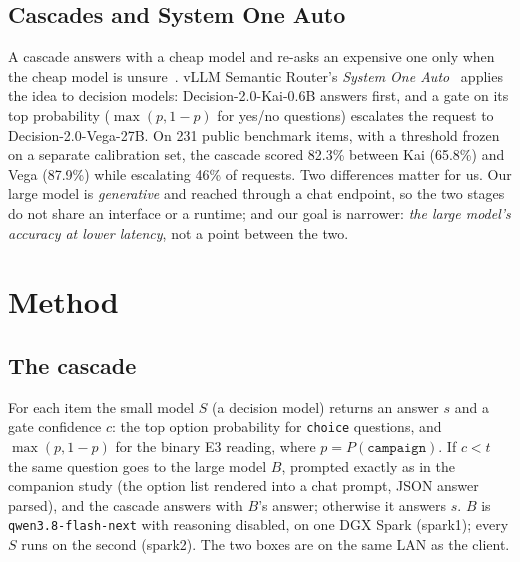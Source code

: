 \documentclass[11pt]{article}
\begin{document}
\subsection{Cascades and System One Auto}
A cascade answers with a cheap model and re-asks an expensive one only when the cheap model is
unsure~\cite{frugalgpt,routellm}. vLLM Semantic Router's \emph{System One Auto}~\cite{sysoneauto}
applies the idea to decision models: Decision-2.0-Kai-0.6B answers first, and a gate on its top
probability ($\max(p,1-p)$ for yes/no questions) escalates the request to Decision-2.0-Vega-27B.
On 231 public benchmark items, with a threshold frozen on a separate calibration set, the cascade
scored 82.3\% between Kai (65.8\%) and Vega (87.9\%) while escalating 46\% of requests. Two
differences matter for us. Our large model is \emph{generative} and reached through a chat endpoint,
so the two stages do not share an interface or a runtime; and our goal is narrower: \emph{the large
model's accuracy at lower latency}, not a point between the two.

\section{Method}

\subsection{The cascade}
For each item the small model $S$ (a decision model) returns an answer $s$ and a gate confidence
$c$: the top option probability for \texttt{choice} questions, and $\max(p, 1-p)$ for the binary
E3 reading, where $p = P(\texttt{campaign})$. If $c < t$ the same question goes to the large model
$B$, prompted exactly as in the companion study (the option list rendered into a chat prompt,
JSON answer parsed), and the cascade answers with $B$'s answer; otherwise it answers $s$. $B$ is
\texttt{qwen3.8-flash-next} with reasoning disabled, on one DGX Spark (spark1); every $S$ runs on
the second (spark2). The two boxes are on the same LAN as the client.
\end{document}
